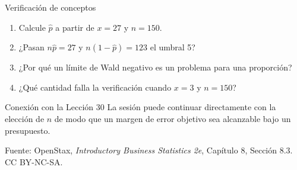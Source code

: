 \documentclass[aspectratio=169,10pt,spanish]{beamer}
\begin{document}
\begin{frame}{Verificación de conceptos}
  \begin{enumerate}
    \item Calcule $\hat{p}$ a partir de $x=27$ y $n=150$.
    \item ¿Pasan $n\hat{p}=27$ y $n(1-\hat{p})=123$ el umbral 5?
    \item ¿Por qué un límite de Wald negativo es un problema para una
      proporción?
    \item ¿Qué cantidad falla la verificación cuando $x=3$ y $n=150$?
  \end{enumerate}

  \vspace{0.6em}
  \begin{block}{Conexión con la Lección 30}
    La sesión puede continuar directamente con la elección de $n$ de modo
    que un margen de error objetivo sea alcanzable bajo un presupuesto.
  \end{block}

  \vfill
  \scriptsize Fuente: OpenStax, \textit{Introductory Business Statistics 2e},
  Capítulo 8, Sección 8.3. CC BY-NC-SA.
\end{frame}

\appendix
\end{document}
